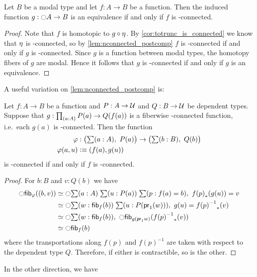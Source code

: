 \begin{lem}\label{lem:nconnected_to_leveln_to_equiv}
Let $B$ be a modal type and let $f:A\to B$ be a function. Then the induced function $g:\ocircle A\to B$ is an
equivalence if and only if $f$ is \modal-connected.
\end{lem}

\begin{proof}
Note that $f$ is homotopic to $g\circ\eta$. By \autoref{cor:totrunc_is_connected} we know that $\eta$ is \modal-connected, so
by
\autoref{lem:nconnected_postcomp} $f$ is \modal-connected if and only if $g$ is \modal-connected. Since $g$ is a function between
modal types, the homotopy fibers of $g$ are modal. Hence it follows that $g$ is \modal-connected if and only if $g$ is an equivalence.
\end{proof}

A useful variation on \autoref{lem:nconnected_postcomp} is:

\begin{lem}\label{lem:nconnected_postcomp_variation}
Let $f:A\to B$ be a function and $P:A\to\mathcal{U}$ and $Q:B\to\mathcal{U}$ be dependent types. Suppose that $g:\prd{a:A} P(a)\to Q(f(a))$
is a fiberwise \modal-connected function, i.e.\ each $g(a)$ is \modal-connected. Then the function
\begin{align*}
\varphi &:\big(\sm{a:A} P(a)\big)\to\big(\sm{b:B} Q(b)\big)\\
\varphi(a,u) &\defeq \pairr{f(a),g(u)}
\end{align*}
is \modal-connected if and only if $f$ is \modal-connected.
\end{lem}

\begin{proof}
For $b:B$ and $v:Q(b)$ we have
\begin{align*}
\modal\hfib{\varphi}{\pairr{b,v}} & \simeq \modal\sm{a:A}{u:P(a)}{p:f(a)= b} \trans{f(p)}{g(u)}= v\\
& \simeq \modal\sm{w:\hfib{f}b}{u:P(\proj1(w))} g(u)= \trans{\opp{f(p)}}{v}\\
& \simeq \modal\sm{w:\hfib{f}b} \modal\hfib{g(\proj1 w)}{\trans{\opp{f(p)}}{v}}\\
& \simeq \modal\hfib{f}b
\end{align*}
where the transportations along $f(p)$ and $f(p)^{-1}$ are taken with respect to the dependent type $Q$.
Therefore, if either is contractible, so is the other.
\end{proof}

In the other direction, we have

